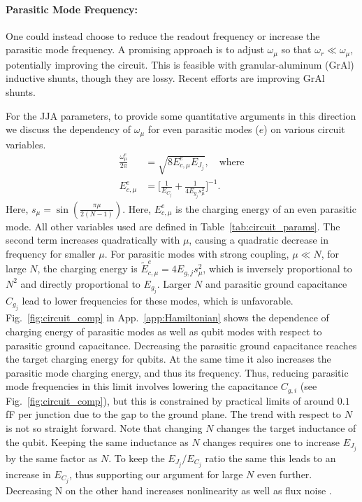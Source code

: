 \documentclass[prx,showpacs,notitlepage,twocolumn,superscriptaddress,nofootinbib,preprintnumbers,floatfix]{revtex4-2}
\newcommand{\sh}[1]{{\color{orange}{{}[SS: #1]}}}%
\begin{document}
\paragraph{Parasitic Mode Frequency:}
One could instead choose to reduce the readout frequency or increase the parasitic mode frequency. A promising approach is to adjust  $\omega_\mu$  so that  $\omega_r \ll \omega_\mu$, potentially improving the circuit. This is feasible with granular-aluminum (GrAl) inductive shunts, though they are lossy. Recent efforts are improving GrAl shunts. 

For the JJA parameters, to provide some quantitative arguments in this direction we discuss the dependency of $\omega_\mu$ for even parasitic modes ($e$) on various circuit variables. 
\begin{align}
    \frac{\omega_\mu^e}{2\pi}&=\sqrt{8E_{c,\mu}^e E_{J_j}},\quad\text{where}\\
    E_{c,\mu}^e&=\Big[\frac{1}{E_{C_j}}+\frac{1}{4E_{g_j}s_\mu^2}\Big]^{-1}.
\end{align}
Here, $s_\mu = \sin (\frac{\pi \mu}{2(N-1)})$. Here, $E_{c,\mu}^e$ is the charging energy of an even parasitic mode. All other variables used are defined in Table~\ref{tab:circuit_params}. The second term increases quadratically with $\mu$, causing a quadratic decrease in frequency for smaller $\mu$. For parasitic modes with strong coupling, $\mu\ll N$, for large $N$, the charging energy is $\tilde{E}^e_{c,\mu} = 4E_{g,j} s_\mu^2$, which is inversely proportional to $N^2$ and directly proportional to $E_{g_j}$. Larger $N$ and parasitic ground capacitance $C_{g_j}$ lead to lower frequencies for these modes, which is unfavorable. Fig.~\ref{fig:circuit_comp} in App.~\ref{app:Hamiltonian} shows the dependence of charging energy of parasitic modes as well as qubit modes with respect to parasitic ground capacitance. Decreasing the parasitic ground capacitance reaches the target charging energy for qubits. At the same time it also increases the parasitic mode charging energy, and thus its frequency. Thus, reducing parasitic mode frequencies in this limit involves lowering the capacitance  $C_{g,i}$ (see Fig.~\ref{fig:circuit_comp}), but this is constrained by practical limits of around $0.1$ fF per junction due to the gap to the ground plane. The trend with respect to $N$ is not so straight forward. Note that changing $N$ changes the target inductance of the qubit. Keeping the same inductance as $N$ changes requires one to increase $E_{J_j}$ by the same factor as $N$. To keep the $E_{J_j}/E_{C_j}$ ratio the same this leads to an increase in $E_{C_j}$, thus supporting our argument for large $N$ even further. Decreasing N on the other hand increases nonlinearity as well as flux noise \sh{CITE}.
\end{document}
